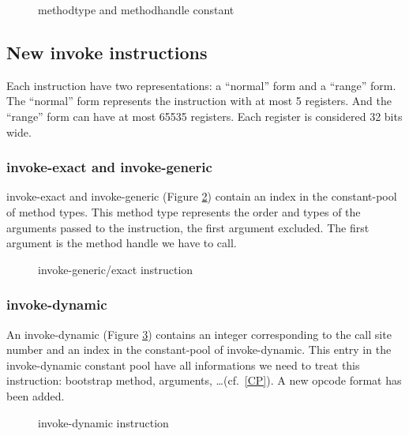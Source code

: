 \documentclass{sig-alternate}
\begin{document}
    \begin{figure}[!h]
      \centering 
      \caption{methodtype and methodhandle constant}
      \label{MTMHldc}
    \end{figure}

  \subsection{New invoke instructions}
    Each instruction have two representations: a ``normal'' form and a ``range'' form.
    The ``normal'' form represents the instruction with at most 5 registers.
    And the ``range'' form can have at most 65535 registers.
    Each register is considered 32 bits wide.

    \subsubsection{invoke-exact and invoke-generic}

      invoke-exact and invoke-generic (Figure \ref{INGEins}) contain an index in the constant-pool of method types.
      This method type represents the order and types of the arguments passed to the instruction, the first argument excluded.
      The first argument is the method handle we have to call.\\

      \begin{figure}[!h]
        \centering 
        \caption{invoke-generic/exact instruction}
        \label{INGEins}
      \end{figure}

    \subsubsection{invoke-dynamic}

      An invoke-dynamic (Figure \ref{INDYins}) contains an integer corresponding to the call site number and an index in the constant-pool of invoke-dynamic.
      This entry in the invoke-dynamic constant pool have all informations we need to treat this instruction: bootstrap method, arguments, \dots (cf.~\ref{CP}).
      A new opcode format has been added.

      \begin{figure}[!h]
        \centering 
        \caption{invoke-dynamic instruction}
        \label{INDYins}
      \end{figure}
\end{document}
